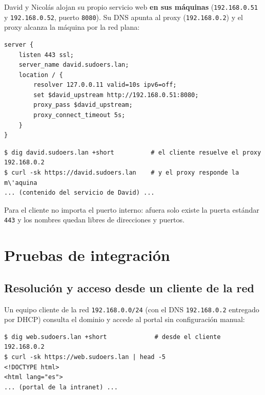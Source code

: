 David y Nicol\'as alojan su propio servicio web \textbf{en sus m\'aquinas}
(\texttt{192.168.0.51} y \texttt{192.168.0.52}, puerto \texttt{8080}). Su DNS
apunta al proxy (\texttt{192.168.0.2}) y el proxy alcanza la m\'aquina por la
red plana:

\begin{lstlisting}[style=terminal]
server {
    listen 443 ssl;
    server_name david.sudoers.lan;
    location / {
        resolver 127.0.0.11 valid=10s ipv6=off;
        set $david_upstream http://192.168.0.51:8080;
        proxy_pass $david_upstream;
        proxy_connect_timeout 5s;
    }
}
\end{lstlisting}

\begin{lstlisting}[style=terminal]
$ dig david.sudoers.lan +short          # el cliente resuelve el proxy
192.168.0.2
$ curl -sk https://david.sudoers.lan    # y el proxy responde la m\'aquina
... (contenido del servicio de David) ...
\end{lstlisting}


Para el cliente no importa el puerto interno: afuera solo existe la puerta
est\'andar \texttt{443} y los nombres quedan libres de direcciones y puertos.

\section{Pruebas de integraci\'on}

\subsection{Resoluci\'on y acceso desde un cliente de la red}

Un equipo cliente de la red \texttt{192.168.0.0/24} (con el DNS
\texttt{192.168.0.2} entregado por DHCP) consulta el dominio y accede al
portal sin configuraci\'on manual:

\begin{lstlisting}[style=terminal]
$ dig web.sudoers.lan +short             # desde el cliente
192.168.0.2
$ curl -sk https://web.sudoers.lan | head -5
<!DOCTYPE html>
<html lang="es">
... (portal de la intranet) ...
\end{lstlisting}

